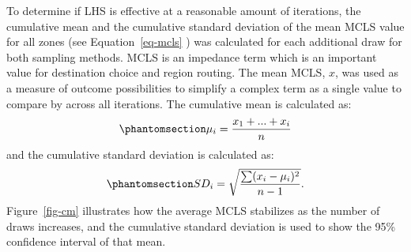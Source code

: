 \documentclass[
  futuretransp,
  submit,
  moreauthors,
]{Definitions/mdpi}
\begin{document}
To determine if LHS is effective at a reasonable amount of iterations,
the cumulative mean and the cumulative standard deviation of the mean 
MCLS value for all zones (see Equation~\ref{eq-mcls} ) was calculated
for each additional draw for both sampling methods. MCLS is an impedance
term which is an important value for destination choice and region
routing. The mean MCLS, \(x\), was used as a measure of outcome
possibilities to simplify a complex term as a single value to compare by
across all iterations. The cumulative mean is calculated as:
\begin{equation}\phantomsection\label{eq-cmclsmean}{
\mu_i = \frac{x_1 + ... + x_i}{n}
}\end{equation} and the cumulative standard deviation is calculated as:
\begin{equation}\phantomsection\label{eq-sdi}{
SD_i = \sqrt{\frac{\sum (x_i - \mu_i)^2 }{n-1}}.
}\end{equation}  Figure~\ref{fig-cm} illustrates how the average MCLS
stabilizes as the number of draws increases, and the cumulative standard deviation
is used to show the 95\% confidence interval of that mean. 
\end{document}
